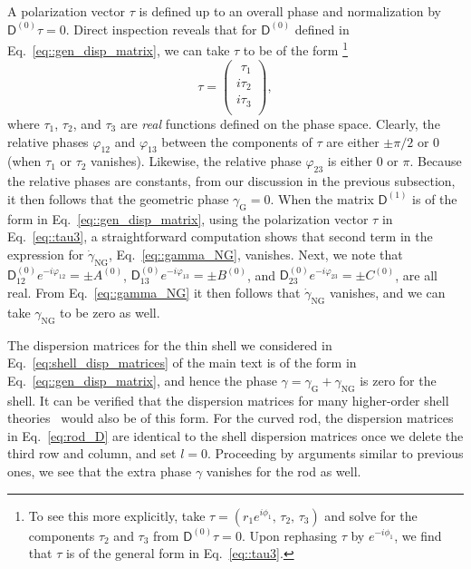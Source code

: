 A polarization vector $\tau$ is defined up to an overall phase and normalization by $\mathsf{D}^{(0)}\tau = 0$.
Direct inspection reveals that for $\mathsf{D}^{(0)}$ defined in Eq.~\eqref{eq::gen_disp_matrix}, we can take $\tau$ to be of the form%
\footnote{To see this more explicitly, take $\tau = (r_{1}e^{i\phi_{1}},\, \tau_{2},\, \tau_{3})$ and solve for the components $\tau_{2}$ and $\tau_{3}$ from $\mathsf{D}^{(0)}\tau = 0$.
  Upon rephasing $\tau$ by $e^{-i\phi_{1}}$, we find that $\tau$ is of the general form in Eq.~\eqref{eq::tau3}.
}
%
\begin{equation}
  \tau =
  \begin{pmatrix}
    \phantom{i}\tau_{1}\\
    i\tau_{2}\\
    i\tau_{3}\\
  \end{pmatrix},
  \label{eq::tau3}
\end{equation}
%
where $\tau_{1}$, $\tau_{2}$, and $\tau_{3}$ are \emph{real} functions defined on the phase space.
Clearly, the relative phases $\varphi_{12}$ and $\varphi_{13}$ between the components of $\tau$ are either $\pm \pi/2$ or $0$ (when $\tau_{1}$ or $\tau_{2}$ vanishes).
Likewise, the relative phase $\varphi_{23}$ is either $0$ or $\pi$.
Because the relative phases are constants, from our discussion in the previous subsection, it then follows that the geometric phase $\gamma_{\text{G}} = 0$.
When the matrix $\mathsf{D}^{(1)}$ is of the form in Eq.~\eqref{eq::gen_disp_matrix}, using the polarization vector $\tau$ in Eq.~\eqref{eq::tau3}, a straightforward computation shows that second term in the expression for $\dot{\gamma}_{\text{NG}}$, Eq.~\eqref{eq::gamma_NG}, vanishes.
Next, we note that $\mathsf{D}_{12}^{(0)}e^{-i\varphi_{12}} = \pm A^{(0)}$, $\mathsf{D}_{13}^{(0)}e^{-i\varphi_{13}} = \pm B^{(0)}$, and $\mathsf{D}_{23}^{(0)}e^{-i\varphi_{23}} = \pm C^{(0)}$, are all real.
From Eq.~\eqref{eq::gamma_NG} it then follows that $\dot{\gamma}_{\text{NG}}$ vanishes, and we can take $\gamma_{\text{NG}}$ to be zero as well.

The dispersion matrices for the thin shell we considered in Eq.~\eqref{eq:shell_disp_matrices} of the main text is of the form in Eq.~\eqref{eq::gen_disp_matrix}, and hence the phase $\gamma = \gamma_{\text{G}} + \gamma_{\text{NG}}$ is zero for the shell.
It can be verified that the dispersion matrices for many higher-order shell theories~\cite{doyle2021} would also be of this form.
For the curved rod, the dispersion matrices in Eq.~\eqref{eq:rod_D} are identical to the shell dispersion matrices once we delete the third row and column, and set $l=0$.
Proceeding by arguments similar to previous ones, we see that the extra phase $\gamma$ vanishes for the rod as well.

